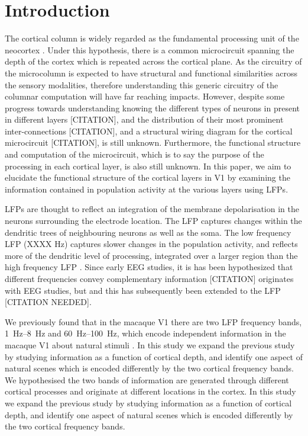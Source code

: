 \section{Introduction}
The cortical column is widely regarded as the fundamental processing unit of the neocortex \citep{Mountcastle1957}.
Under this hypothesis, there is a common microcircuit spanning the depth of the cortex which is repeated across the cortical plane.
As the circuitry of the microcolumn is expected to have structural and functional similarities across the sensory modalities, therefore understanding this generic circuitry of the columnar computation will have far reaching impacts.
However, despite some progress towards understanding knowing the different types of neurons in present in different layers [CITATION], and the distribution of their most prominent inter-connections [CITATION], and a structural wiring diagram for the cortical microcircuit [CITATION], is still unknown.
Furthermore, the functional structure and computation of the microcircuit, which is to say the purpose of the processing in each cortical layer, is also still unknown.
In this paper, we aim to elucidate the functional structure of the cortical layers in \ac{V1} by examining the information contained in population activity at the various layers using \acp{LFP}.

\acp{LFP} are thought to reflect an integration of the membrane depolarisation in the neurons surrounding the electrode location.
The \ac{LFP} captures changes within the dendritic trees of neighbouring neurons as well as the soma.
The low frequency \ac{LFP} (XXXX \si{Hz}) captures slower changes in the population activity, and reflects more of the dendritic level of processing, integrated over a larger region than the high frequency \ac{LFP} \citep{Leski2013}.
Since early \ac{EEG} studies, it is has been hypothesized that different frequencies convey complementary information [CITATION] originates with \ac{EEG} studies, but and this has subsequently been extended to the \ac{LFP} [CITATION NEEDED].


We previously found that in the macaque \ac{V1} there are two \ac{LFP} frequency bands, \SIrange{1}{8}{Hz} and \SIrange{60}{100}{Hz}, which encode independent information in the macaque \ac{V1} about natural stimuli \citep{Belitski2008}.
In this study we expand the previous study by studying information as a function of cortical depth, and identify one aspect of natural scenes which is encoded differently by the two cortical frequency bands.
We hypothesised the two bands of information are generated through different cortical processes and originate at different locations in the cortex.
In this study we expand the previous study by studying information as a function of cortical depth, and identify one aspect of natural scenes which is encoded differently by the two cortical frequency bands.

